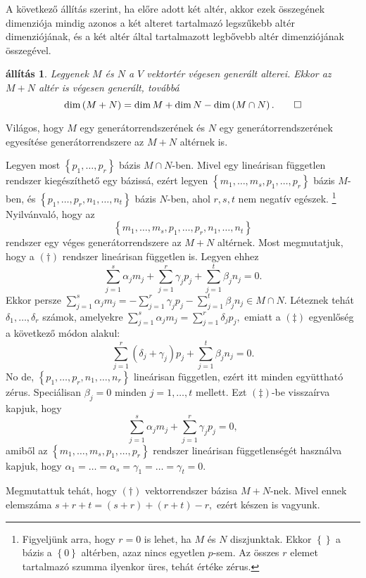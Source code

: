 \documentclass[9pt, showtrims]{memoir}
\makeatletter
\renewenvironment{proof}[1][\proofname]
    {\par\pushQED{\qed}%
    \normalfont \topsep6\p@\@plus6\p@\relax
    \trivlist
    \item[\hskip\labelsep
        \itshape
    #1\@addpunct{:}]\ignorespaces}
    {\popQED\endtrivlist\@endpefalse}
\theoremstyle{plain}
\newtheorem{proposition}{állítás}[section]
\theoremstyle{remark}
\theoremstyle{definition}
\makeatother
\begin{document}
A következő állítás szerint,
ha előre adott két altér, akkor ezek összegének dimenziója mindig azonos
a két alteret tartalmazó legszűkebb altér dimenziójának,
és a két altér által tartalmazott legbővebb altér  dimenziójának összegével.
\begin{proposition}\label{pr:drosszeg2}
    Legyenek $M$ és $N$ a $V$ vektortér végesen generált alterei.
    Ekkor az $M+N$ altér is végesen generált, 
    továbbá
    \[
        \dim\left( M+N \right)=\dim M+\dim N-\dim \left( M\cap N \right).\qedhere
    \]
\end{proposition}
\begin{proof}
    Világos, hogy $M$ egy generátorrendszerének és $N$ egy generátorrendszerének egyesítése
    generátorrendszere az $M+N$ altérnek is.

    Legyen most $\left\{ p_1,\dots,p_r \right\}$ bázis $M\cap N$-ben.
    Mivel egy lineárisan független rendszer kiegészíthető egy bázissá,
    ezért legyen
    $\left\{ m_1,\dots,m_s,p_1,\dots,p_r \right\}$ bázis $M$-ben, 
    és
    $\left\{ p_1,\dots,p_r,n_1,\dots,n_t \right\}$ bázis $N$-ben,
    ahol $r,s,t$ nem negatív egészek.%
    \footnote{
        Figyeljünk arra, hogy $r=0$ is lehet, ha $M$ és $N$ diszjunktak.
        Ekkor $\left\{  \right\}$ a bázis a $\left\{ 0 \right\}$ altérben,
        azaz nincs egyetlen $p$-sem. 
    Az összes $r$ elemet tartalmazó szumma ilyenkor üres, tehát értéke zérus.
    }
    Nyilvánvaló, hogy az
    \[
        \left\{ m_1,\dots,m_s,p_1,\dots,p_r,n_1,\dots,n_t \right\}\tag{\dag}
    \]
    rendszer egy véges generátorrendszere az $M+N$ altérnek.
    Most megmutatjuk,
    hogy a $(\dag)$ rendszer lineárisan független is.
    Legyen ehhez
    \[
        \sum_{j=1}^s\alpha_j m_j+\sum_{j=1}^r\gamma_j p_j+\sum_{j=1}^t\beta_jn_j=0.\tag{\ddag}
    \]
    Ekkor persze 
    \(
        \sum_{j=1}^s\alpha_j m_j =
        -\sum_{j=1}^r\gamma_j p_j
        -\sum_{j=1}^t\beta_jn_j
        \in
        M\cap N.
    \)
    Léteznek tehát $\delta_1,\dots,\delta_r$ számok, 
    amelyekre
    \(
        \sum_{j=1}^s\alpha_j m_j=
        \sum_{j=1}^r\delta_j p_j,
    \)
    emiatt a $(\ddag)$ egyenlőség a következő módon alakul:
    \[
        \sum_{j=1}^r\left( \delta_j+\gamma_j \right)p_j+\sum_{j=1}^t\beta_jn_j=0.
    \]
    No de, $\left\{ p_1,\dots,p_r,n_1,\dots,n_r \right\}$ lineárisan független,
    ezért itt minden együttható zérus.
    Speciálisan $\beta_j=0$ minden $j=1,\dots,t$ mellett.
    Ezt $(\ddag)$-be visszaírva kapjuk, hogy
    \[
        \sum_{j=1}^s\alpha_j m_j+\sum_{j=1}^r\gamma_j p_j=0,
    \]
    amiből az $\left\{ m_1,\dots,m_s,p_1,\dots,p_r \right\}$ rendszer lineárisan függetlenségét használva kapjuk,
    hogy $\alpha_1=\dots=\alpha_s=\gamma_1=\dots=\gamma_t=0$.


    Megmutattuk tehát, hogy $(\dag)$ vektorrendszer bázisa $M+N$-nek.
    Mivel ennek elemszáma
    \begin{math}
        s+r+t=\left( s+r \right)+\left( r+t \right)-r,
    \end{math}
    ezért készen is vagyunk.
\end{proof}
\end{document}
